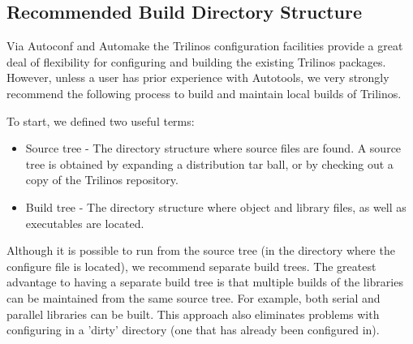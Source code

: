 \subsection{Recommended Build Directory Structure}
\label{subsect:BuildDirectoryStructure}

Via Autoconf and Automake the Trilinos configuration facilities
provide a great deal of flexibility for configuring and building the
existing Trilinos packages.  However, unless a user has prior experience
with Autotools, we very strongly recommend the following process to build and
maintain local builds of Trilinos.

To start, we defined two useful terms:
\begin{itemize}
\item Source tree - The directory structure where source files are found.  A source 
tree is obtained by expanding a distribution tar ball, or by checking 
out a copy of the Trilinos repository.  
\item Build tree - The directory structure where object and library files, as 
well as executables are located.  
\end{itemize}
 
\begin{minipage}[c]{\textwidth}

\begin{minipage}[l]{.6\textwidth}

Although it is possible to run  from the source tree (in 
the directory where the configure file is located), we recommend 
separate build trees.  The greatest advantage to having a separate 
build tree is that multiple builds of the libraries can be maintained
from the same source tree.  For example, both serial and parallel libraries
can be built.  
This approach also eliminates problems with configuring in a 'dirty'
directory (one that has already been configured in).
\end{minipage}\hfill
{}
\end{minipage}

